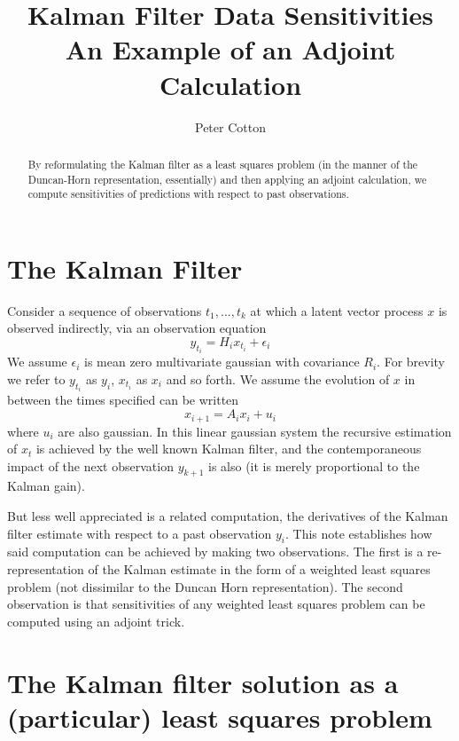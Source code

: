 \documentclass[a4paper,11pt]{article}
\title{Kalman Filter Data Sensitivities \\ An Example of an Adjoint Calculation}
\author{Peter Cotton}
\date{}
\begin{document}
\maketitle

\begin{abstract}
By reformulating the Kalman filter as a least squares problem (in the manner of the Duncan-Horn representation, essentially) and then applying an adjoint calculation, we compute sensitivities of predictions with respect to past observations. 
\end{abstract}

\section{The Kalman Filter}

Consider a sequence of observations $t_1,...,t_k$ at which a latent vector process $x$ is observed indirectly, via an observation equation \begin{equation} y_{t_i} = H_i x_{t_i} + \epsilon_i \end{equation} We assume $\epsilon_i$ is mean zero multivariate gaussian with covariance $R_i$. For brevity we refer to $y_{t_i}$ as $y_i$, $x_{t_i}$ as $x_i$ and so forth. We assume the evolution of $x$ in between the times specified can be written \begin{equation} x_{i+1} = A_i x_i + u_i \end{equation} where $u_i$ are also gaussian. In this linear gaussian system the recursive estimation of $x_t$ is achieved by the well known Kalman filter, and the contemporaneous impact of the next observation $y_{k+1}$ is also (it is merely proportional to the Kalman gain).

But less well appreciated is a related computation, the derivatives of the Kalman filter estimate with respect to a past observation $y_i$. This note establishes how said computation can be achieved by making two observations. The first is a re-representation of the Kalman estimate in the form of a weighted least squares problem (not dissimilar to the Duncan Horn representation). The second observation is that sensitivities of any weighted least squares problem can be computed using an adjoint trick.

\section{The Kalman filter solution as a (particular) least squares problem}
\end{document}
